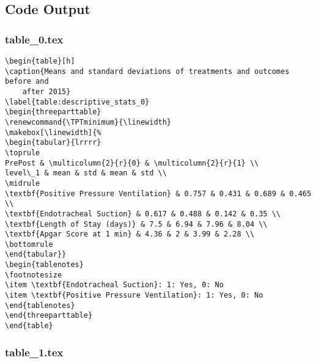 \documentclass[11pt]{article}
\begin{document}
\subsection{Code Output}

\subsubsection*{table\_0.tex}

\begin{Verbatim}[tabsize=4]
\begin{table}[h]
\caption{Means and standard deviations of treatments and outcomes before and
	after 2015}
\label{table:descriptive_stats_0}
\begin{threeparttable}
\renewcommand{\TPTminimum}{\linewidth}
\makebox[\linewidth]{%
\begin{tabular}{lrrrr}
\toprule
PrePost & \multicolumn{2}{r}{0} & \multicolumn{2}{r}{1} \\
level\_1 & mean & std & mean & std \\
\midrule
\textbf{Positive Pressure Ventilation} & 0.757 & 0.431 & 0.689 & 0.465 \\
\textbf{Endotracheal Suction} & 0.617 & 0.488 & 0.142 & 0.35 \\
\textbf{Length of Stay (days)} & 7.5 & 6.94 & 7.96 & 8.04 \\
\textbf{Apgar Score at 1 min} & 4.36 & 2 & 3.99 & 2.28 \\
\bottomrule
\end{tabular}}
\begin{tablenotes}
\footnotesize
\item \textbf{Endotracheal Suction}: 1: Yes, 0: No
\item \textbf{Positive Pressure Ventilation}: 1: Yes, 0: No
\end{tablenotes}
\end{threeparttable}
\end{table}

\end{Verbatim}

\subsubsection*{table\_1.tex}
\end{document}
